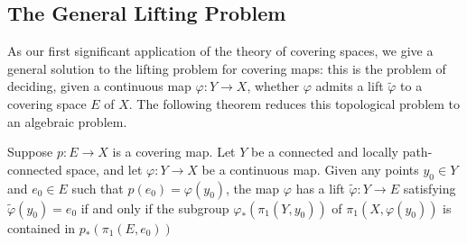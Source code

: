 \subsection{The General Lifting Problem}
As our first significant application of the theory of covering spaces, we give a general solution to the lifting problem for covering maps: this is the problem of deciding, given a continuous map $\varphi:Y\to X$, whether $\varphi$ admits a lift $\widetilde{\varphi}$ to a covering space $E$ of $X$. The following theorem reduces this topological problem to an algebraic problem.
\begin{theorem}\label{lift crit}
Suppose $p:E\to X$ is a covering map. Let $Y$ be a connected and locally path-connected space, and let $\varphi:Y\to X$ be a continuous map. Given any points $y_0\in Y$ and $e_0\in E$ such that $p(e_0)=\varphi(y_0)$, the map $\varphi$ has a lift $\widetilde{\varphi}:Y\to E$ satisfying $\widetilde{\varphi}(y_0)=e_0$ if and only if the subgroup $\varphi_*(\pi_1(Y,y_0))$ of $\pi_1(X,\varphi(y_0))$ is contained in $p_*(\pi_1(E,e_0))$
\end{theorem}
